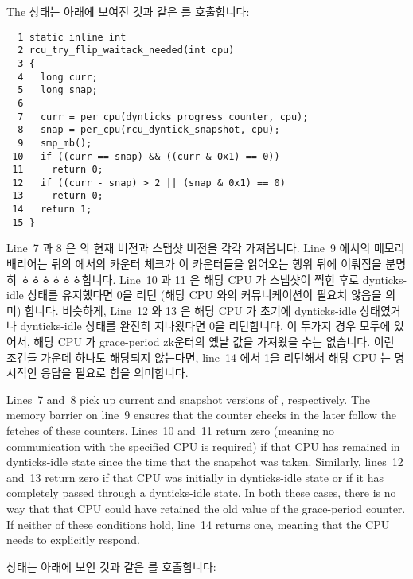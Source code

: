 The  상태는 아래에 보여진 것과 같은
 를 호출합니다:
\iffalse

The \co{rcu_try_flip_waitack_state()} state invokes
\co{rcu_try_flip_waitack_needed()}, shown below:
\fi

{ \scriptsize
\begin{verbatim}
  1 static inline int
  2 rcu_try_flip_waitack_needed(int cpu)
  3 {
  4   long curr;
  5   long snap;
  6
  7   curr = per_cpu(dynticks_progress_counter, cpu);
  8   snap = per_cpu(rcu_dyntick_snapshot, cpu);
  9   smp_mb();
 10   if ((curr == snap) && ((curr & 0x1) == 0))
 11     return 0;
 12   if ((curr - snap) > 2 || (snap & 0x1) == 0)
 13     return 0;
 14   return 1;
 15 }
\end{verbatim}
}

Line~7 과 8 은  의 현재 버전과 스탭샷 버전을 각각
가져옵니다.
Line~9 에서의 메모리 배리어는 뒤의  에서의
카운터 체크가 이 카운터들을 읽어오는 행위 뒤에 이뤄짐을 분명히
ㅎㅎㅎㅎㅎㅎ합니다.
Line~10 과 11 은 해당 CPU 가 스냅샷이 찍힌 후로 dynticks-idle 상태를 유지했다면
0을 리턴 (해당 CPU 와의 커뮤니케이션이 필요치 않음을 의미) 합니다.
비슷하게, Line~12 와 13 은 해당 CPU 가 초기에 dynticks-idle 상태였거나
dynticks-idle 상태를 완전히 지나왔다면 0을 리턴합니다.
이 두가지 경우 모두에 있어서, 해당 CPU 가 grace-period zk운터의 옜날 값을
가져왔을 수는 없습니다.
이런 조건들 가운데 하나도 해당되지 않는다면, line~14 에서 1을 리턴해서 해당 CPU
는 명시적인 응답을 필요로 함을 의미합니다.

Lines~7 and~8 pick up current and snapshot versions of
, respectively.
The memory barrier on line~9 ensures that the counter checks
in the later  follow
the fetches of these counters.
Lines~10 and~11 return zero (meaning no communication with the
specified CPU is required) if that CPU has remained in dynticks-idle
state since the time that the snapshot was taken.
Similarly, lines~12 and~13 return zero if that CPU was initially
in dynticks-idle state or if it has completely passed through a
dynticks-idle state.
In both these cases, there is no way that that CPU could have retained
the old value of the grace-period counter.
If neither of these conditions hold, line~14 returns one, meaning
that the CPU needs to explicitly respond.

 상태는 아래에 보인 것과 같은
 를 호출합니다:
\iffalse

